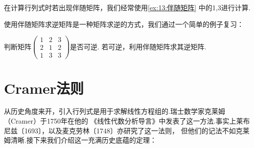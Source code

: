 在计算行列式时若出现伴随矩阵，我们经常使用\autoref{ex:13:伴随矩阵} 中的1,3进行计算.

使用伴随矩阵求逆矩阵是一种矩阵求逆的方式，我们通过一个简单的例子复习：
\begin{example}
    判断矩阵$\begin{pmatrix}
        1 & 2 & 3 \\ 2 & 1 & 2 \\ 1 & 3 & 3
    \end{pmatrix}$是否可逆. 若可逆，利用伴随矩阵求其逆矩阵.
\end{example}
\begin{solution}

\end{solution}

\section{Cramer法则}
从历史角度来开，引入行列式是用于求解线性方程组的.瑞士数学家克莱姆（Cramer）于1750年在他的
《线性代数分析导言》中发表了这一方法.事实上莱布尼兹〔1693〕，以及麦克劳林〔1748〕亦研究了这一法则，
但他们的记法不如克莱姆清晰.接下来我们介绍这一充满历史底蕴的定理：
